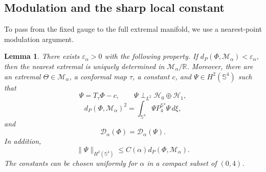 \documentclass[11pt]{article}
\newtheorem{lemma}[theorem]{Lemma}
\numberwithin{equation}{section}
\begin{document}
\subsection{Modulation and the sharp local constant}

To pass from the fixed gauge to the full extremal manifold, we use a nearest-point modulation argument.

\begin{lemma}\label{lem:local-modulation}
There exists \(\varepsilon_{\alpha}>0\) with the following property. If
\(d_{P}(\Phi,\mathcal M_{\alpha})<\varepsilon_{\alpha}\), then the nearest
extremal is uniquely determined in \(\mathcal M_{\alpha}/\mathbb R\). Moreover,
there are an extremal \(\Theta\in\mathcal M_{\alpha}\), a conformal map
\(\tau\), a constant \(c\), and \(\Psi\in H^{2}(\mathbb S^{4})\) such that
\begin{equation}\label{eq:modulation-decomposition}
\Psi=T_{\tau}\Phi-c,
\qquad
\Psi\perp_{L^{2}}\mathcal H_{0}\oplus\mathcal H_{1},
\end{equation}
\begin{equation}\label{eq:distance-exact}
d_{P}(\Phi,\mathcal M_{\alpha})^{2}
=\int_{\mathbb S^{4}}\Psi P_{4}^{\mathbb S^{4}}\Psi\,d\xi,
\end{equation}
and
\begin{equation}\label{eq:deficit-exact-modulation}
\mathcal D_{\alpha}(\Phi)=\mathcal D_{\alpha}(\Psi).
\end{equation}
In addition,
\begin{equation}\label{eq:modulation-H2-control}
\|\Psi\|_{H^{2}(\mathbb S^{4})}
\leq C(\alpha)d_{P}(\Phi,\mathcal M_{\alpha}).
\end{equation}
The constants can be chosen uniformly for \(\alpha\) in a compact subset of
\((0,4)\).
\end{lemma}
\end{document}
